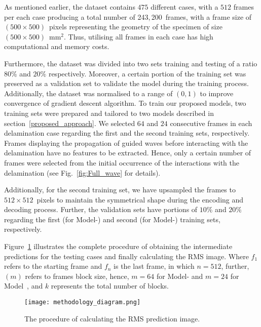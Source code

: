 As mentioned earlier, the dataset contains \(475\) different cases, with a \(512\) frames per each case producing a total number of 243,\,200~frames, with a frame size of \((500\times500)\)~pixels representing the geometry of the specimen of size \((500\times500)\)~mm\(^{2}\).
Thus, utilising all frames in each case has high computational and memory costs.

Furthermore, the dataset was divided into two sets training and testing of a ratio \(80\%\) and \(20\% \) respectively.
Moreover, a certain portion of the training set was preserved as a validation set to validate the model during the training process.
Additionally, the dataset was normalised to a range of \((0, 1)\) to improve convergence of gradient descent algorithm.
To train our proposed models, two training sets were prepared and tailored to two models described in section~\ref{proposed_approach}.
We selected \(64\) and \(24\) consecutive frames in each delamination case regarding the first and the second training sets, respectively.
Frames displaying the propagation of guided waves before interacting with the delamination have no features to be extracted.  
Hence, only a certain number of frames were selected from the initial occurrence of the interactions with the delamination (see Fig.~\ref{fig:Full_wave} for details).

Additionally, for the second training set, we have upsampled the frames to \(512\times512\)~pixels to maintain the symmetrical shape during the encoding and decoding process.
Further, the validation sets have portions of \(10\%\) and \(20\%\) regarding the first (for Model-) and second (for Model-) training sets, respectively.

Figure~\ref{fig:Diagram_exp_predictions} illustrates the complete procedure of obtaining the intermediate predictions for the testing cases and finally calculating the RMS image.
Where \(f_{1}\) refers to the starting frame and \(f_{n}\) is the last frame, in which \(n=512\), further, \((m)\) refers to frames block size, hence, \(m=64\) for Model- and \(m=24\) for Model~, and \(k\) represents the total number of blocks.
\begin{figure}[!h]
	\centering
	\texttt{[image: methodology\_diagram.png]}
	\caption{The procedure of calculating the RMS prediction image.}
	\label{fig:Diagram_exp_predictions}
\end{figure}
\newpage